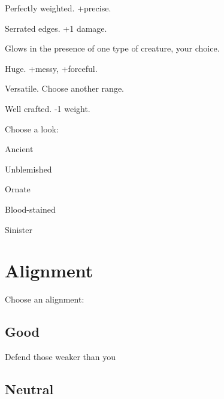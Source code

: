              
\item Perfectly weighted. +precise.

             
\item Serrated edges. +1 damage.

             
\item Glows in the presence of one type of creature, your choice.

             
\item Huge. +messy, +forceful.

             
\item Versatile. Choose another range.

             
\item Well crafted. -1 weight.

           
\stopitemize
           

Choose a look:

           
\startitemize[1,packed]
             
\item Ancient

             
\item Unblemished

             
\item Ornate

             
\item Blood-stained

             
\item Sinister

           
\stopitemize
         

       

       
\section{Alignment}   
       
\startInstructionsAfterHeader
Choose an alignment:
\stopInstructionsAfterHeader
       

         
\subsection{Good}   
         

Defend those weaker than you

         
\subsection{Neutral}   
         

